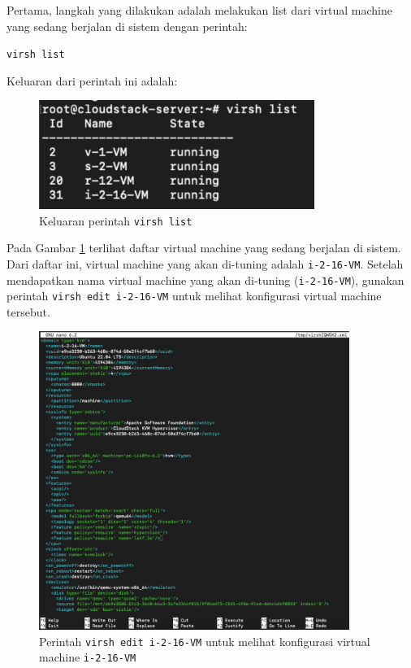 Pertama, langkah yang dilakukan adalah melakukan list dari virtual machine yang sedang berjalan di sistem dengan perintah:

\texttt{virsh list}

Keluaran dari perintah ini adalah:
\begin{figure}
    \centering
    \includegraphics[width=0.8\textwidth]
    {assets/pics/virsh_list.png}
    \caption{Keluaran perintah \texttt{virsh list}}
    \label{fig:virsh_list}
\end{figure}

Pada Gambar \ref{fig:virsh_list} terlihat daftar virtual machine yang sedang berjalan di sistem. Dari daftar ini, virtual machine yang akan di-tuning adalah \texttt{i-2-16-VM}. Setelah mendapatkan nama virtual machine yang akan di-tuning (\texttt{i-2-16-VM}), gunakan perintah \texttt{virsh edit i-2-16-VM} untuk melihat konfigurasi virtual machine tersebut.

\begin{figure}
    \centering
    \includegraphics[width=0.9\textwidth]
    {assets/pics/virsh_edit1.png}
    \caption{Perintah \texttt{virsh edit i-2-16-VM} untuk melihat konfigurasi virtual machine \texttt{i-2-16-VM}}
    \label{fig:virsh_edit1}
\end{figure}

